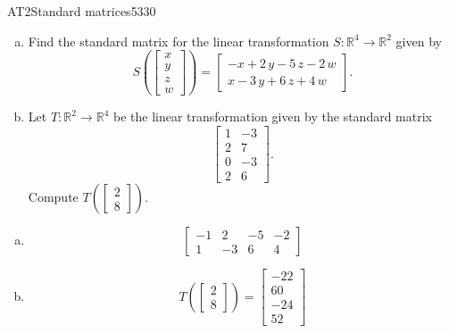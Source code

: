 \begin{exercise}{AT2}{Standard matrices}{5330} 
\begin{exerciseStatement} 

\begin{enumerate}[(a)]
\item Find the standard matrix for the linear transformation \(S:\mathbb{R}^4 \to \mathbb{R}^2\) given by \[S\left( \left[\begin{array}{c}
x \\
y \\
z \\
{w}
\end{array}\right] \right) = \left[\begin{array}{c}
-x + 2 \, y - 5 \, z - 2 \, {w} \\
x - 3 \, y + 6 \, z + 4 \, {w}
\end{array}\right].\] 
\item Let \(T:\mathbb{R}^2 \to \mathbb{R}^4\) be the linear transformation given by the standard matrix \[\left[\begin{array}{cc}
1 & -3 \\
2 & 7 \\
0 & -3 \\
2 & 6
\end{array}\right].\] Compute \(T\left(\left[\begin{array}{c}
2 \\
8
\end{array}\right]\right)\). 
\end{enumerate}

     \end{exerciseStatement}
 \begin{exerciseAnswer} 

\begin{enumerate}[(a)]
\item  \[\left[\begin{array}{cccc}
-1 & 2 & -5 & -2 \\
1 & -3 & 6 & 4
\end{array}\right]\] 
\item  \[T\left(\left[\begin{array}{c}
2 \\
8
\end{array}\right]\right)=\left[\begin{array}{c}
-22 \\
60 \\
-24 \\
52
\end{array}\right]\] 
\end{enumerate}

     \end{exerciseAnswer}
 \end{exercise}


